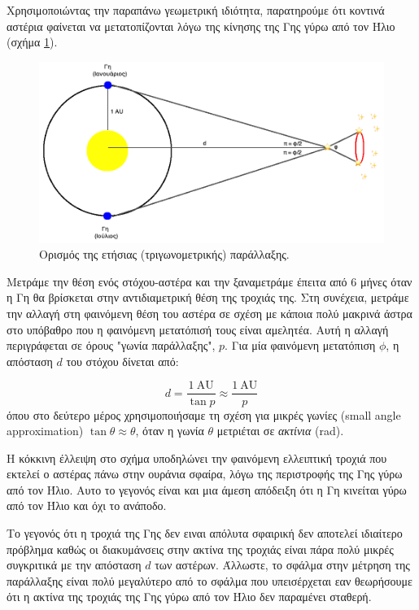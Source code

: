 Χρησιμοποιώντας την παραπάνω γεωμετρική ιδιότητα, παρατηρούμε ότι κοντινά αστέρια φαίνεται να μετατοπίζονται λόγω της κίνησης της Γης γύρω από τον Ήλιο (σχήμα \ref{fig:parallax}).

\begin{figure}[h]
    \centering
    \includegraphics[scale=0.3]{Figures/parallax.png}
    \caption{Ορισμός της ετήσιας (τριγωνομετρικής) παράλλαξης.}
    \label{fig:parallax}
\end{figure}

Μετράμε την θέση ενός στόχου-αστέρα και την ξαναμετράμε έπειτα από 6 μήνες όταν η Γη θα βρίσκεται στην αντιδιαμετρική θέση της τροχιάς της. Στη συνέχεια, μετράμε την αλλαγή στη φαινόμενη θέση του αστέρα σε σχέση με κάποια πολύ μακρινά άστρα στο υπόβαθρο που η φαινόμενη μετατόπισή τους είναι αμελητέα. Αυτή η αλλαγή περιγράφεται σε όρους "γωνία παράλλαξης", $p$. Για μία φαινόμενη μετατόπιση $\phi$, η απόσταση $d$ του στόχου δίνεται από:

\begin{equation}
    d = \frac{1 \ \text{AU}}{\tan p} \approx \frac{1 \ \text{AU}}{p}
\end{equation}
όπου στο δεύτερο μέρος χρησιμοποιήσαμε τη σχέση για μικρές γωνίες (small angle approximation) $\tan \theta \approx \theta$, όταν η γωνία $\theta$ μετριέται σε \textit{ακτίνια} (rad).

Η κόκκινη έλλειψη στο σχήμα υποδηλώνει την φαινόμενη ελλειπτική τροχιά που εκτελεί ο αστέρας πάνω στην ουράνια σφαίρα, λόγω της περιστροφής της Γης γύρω από τον Ήλιο. Αυτο το γεγονός είναι και μια άμεση απόδειξη ότι η Γη κινείται γύρω από τον Ήλιο και όχι το ανάποδο.

Το γεγονός ότι η τροχιά της Γης δεν ειναι απόλυτα σφαιρική δεν αποτελεί ιδιαίτερο πρόβλημα καθώς οι διακυμάνσεις στην ακτίνα της τροχιάς είναι πάρα πολύ μικρές συγκριτικά με την απόσταση $d$ των αστέρων. Άλλωστε, το σφάλμα στην μέτρηση της παράλλαξης είναι πολύ μεγαλύτερο από το σφάλμα που υπεισέρχεται εαν θεωρήσουμε ότι η ακτίνα της τροχιάς της Γης γύρω από τον Ήλιο δεν παραμένει σταθερή.


